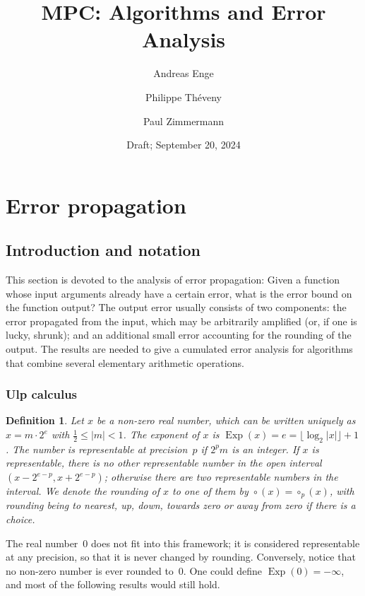 \documentclass [11pt]{article}
\title {MPC: Algorithms and Error Analysis}
\author {Andreas Enge \and Philippe Th\'eveny \and Paul Zimmermann}
\date {Draft; September 20, 2024}
\DeclareMathOperator{\Exp}{\operatorname {Exp}}
\newcommand {\round}{\operatorname {\circ}}
\newtheorem{definition}[theorem]{Definition}
\begin{document}
\maketitle
\tableofcontents


\section {Error propagation}

\subsection {Introduction and notation}

This section is devoted to the analysis of error propagation: Given a function
whose input arguments already have a certain error, what is the error bound on
the function output? The output error usually consists of two components: the
error propagated from the input, which may be arbitrarily amplified (or, if
one is lucky, shrunk); and an
additional small error accounting for the rounding of the output. The results
are needed to give a cumulated error analysis for algorithms that combine
several elementary arithmetic operations.


\subsubsection {Ulp calculus}

\begin {definition}
\label {def:exp}
Let $x$ be a non-zero real number, which can be written uniquely as
$x = m \cdot 2^e$ with $\frac{1}{2} \le |m| < 1$.
The {\em exponent} of $x$ is
$\Exp(x) = e = \lfloor \log_2 |x| \rfloor + 1$.
The number is {\em representable at precision~$p$} if
$2^p m$ is an integer.
If $x$ is representable, there is no other representable number in the
open interval $(x - 2^{e-p}, x + 2^{e-p})$; otherwise there are two
representable numbers in the interval.
We denote the rounding of $x$ to one of them by
$\round (x) = \round_p (x)$, with rounding being to nearest, up, down,
towards zero or away from zero if there is a choice.
\end {definition}

The real number~$0$ does not fit into this framework; it is considered
representable at any precision, so that it is never changed by rounding.
Conversely, notice that no non-zero number is ever rounded to~$0$.
One could define $\Exp(0) = -\infty$, and most of the following results
would still hold.
\end{document}
